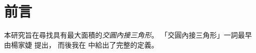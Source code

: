 \chapter{前言}

本研究旨在尋找具有最大面積的\emph{交圓內接三角形}。
「交圓內接三角形」一詞最早由楊家婕 \cite{yang} 提出，
而後我在 \cite{liu} 中給出了完整的定義。